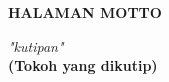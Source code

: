 \clearpage
{}
{}

\begin{center}
	\textbf{\large HALAMAN MOTTO}\\[5em]
\end{center}

\begin{center}
    \textit{"kutipan"} \\
    \textbf{(Tokoh yang dikutip)} \\[1cm]
\end{center} 